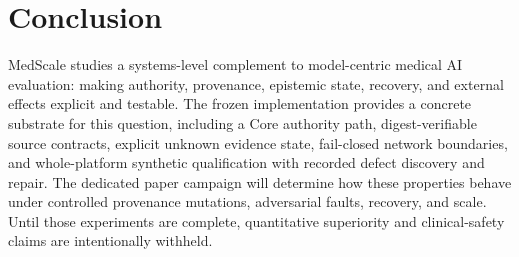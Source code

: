 \section{Conclusion}

MedScale studies a systems-level complement to model-centric medical AI evaluation: making authority, provenance, epistemic state, recovery, and external effects explicit and testable. The frozen implementation provides a concrete substrate for this question, including a Core authority path, digest-verifiable source contracts, explicit unknown evidence state, fail-closed network boundaries, and whole-platform synthetic qualification with recorded defect discovery and repair. The dedicated paper campaign will determine how these properties behave under controlled provenance mutations, adversarial faults, recovery, and scale. Until those experiments are complete, quantitative superiority and clinical-safety claims are intentionally withheld.
